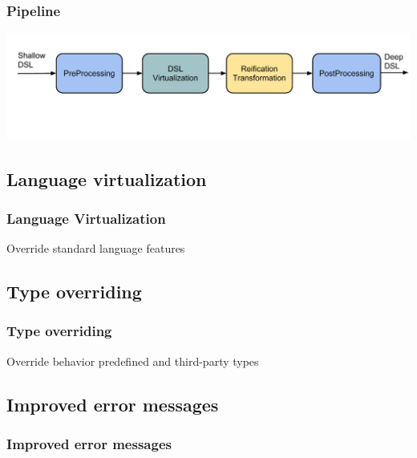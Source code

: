 \documentclass[xcolor=dvipsnames]{beamer}
\theoremstyle{definition}
\begin{document}
\begin{frame}[fragile]
    \frametitle{Pipeline}
    \begin{center}
        \includegraphics[width=\textwidth]{img/Architecture.pdf}
    \end{center}
\end{frame}


\subsection{Language virtualization} %
\label{sub:Languagevirtualization}
\begin{frame}[fragile]
    \frametitle{Language Virtualization}
    \begin{block}{Override standard language features}
        
    \end{block}
\end{frame}


\subsection{Type overriding} %
\label{sub:Typeoverriding}

\begin{frame}[fragile]
    \frametitle{Type overriding}
    \begin{block}{Override behavior predefined and third-party types}
        
    \end{block}
\end{frame}


\subsection{Improved error messages} %
\label{sub:Improvederrormessages}
\begin{frame}[fragile]
    \frametitle{Improved error messages}
    \begin{block}{}
        
    \end{block}
\end{frame}
\end{document}
